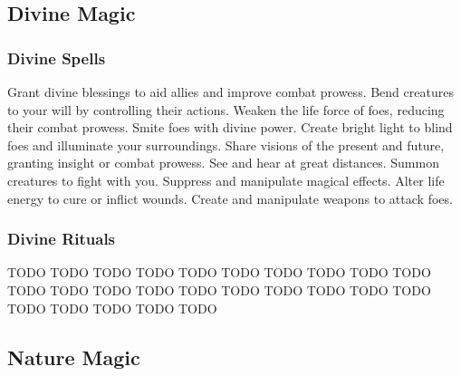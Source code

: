 \small
\subsection{Divine Magic}\label{Divine Magic}
\subsubsection{Divine Spells}\label{Divine Spells}
\begin{spelllist}
 Grant divine blessings to aid allies and improve combat prowess.
 Bend creatures to your will by controlling their actions.
 Weaken the life force of foes, reducing their combat prowess.
 Smite foes with divine power.
 Create bright light to blind foes and illuminate your surroundings.
 Share visions of the present and future, granting insight or combat prowess.
 See and hear at great distances.
 Summon creatures to fight with you.
 Suppress and manipulate magical effects.
 Alter life energy to cure or inflict wounds.
 Create and manipulate weapons to attack foes.
\end{spelllist}
\subsubsection{Divine Rituals}\label{Divine Rituals}
\begin{spelllist}
 TODO
 TODO
 TODO
 TODO
 TODO
 TODO
 TODO
 TODO
 TODO
 TODO
 TODO
 TODO
 TODO
 TODO
 TODO
 TODO
 TODO
 TODO
 TODO
 TODO
 TODO
 TODO
 TODO
 TODO
 TODO
\end{spelllist}




\small
\subsection{Nature Magic}\label{Nature Magic}
